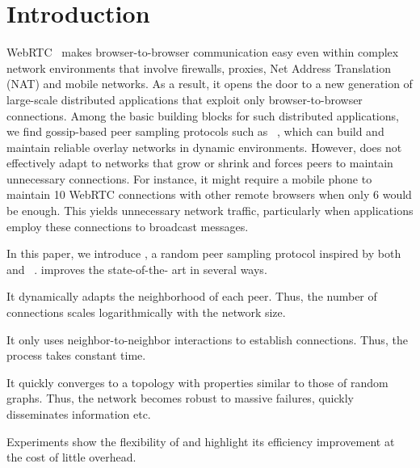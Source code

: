 
\section{Introduction}


WebRTC~\cite{webrtc} makes browser-to-browser communication easy even within
complex network environments that involve firewalls, proxies, Net Address
Translation (NAT) and mobile networks. As a result, it opens the door to a new
generation of large-scale distributed applications that exploit only
browser-to-browser connections. Among the basic building blocks for such
distributed applications, we find gossip-based peer sampling protocols such as
\CYCLON~\cite{voulgaris2005cyclon}, which can build and maintain reliable
overlay networks in dynamic environments.  However, \CYCLON does not effectively
adapt to networks that grow or shrink and forces peers to maintain unnecessary
connections.  For instance, it might require a mobile phone to maintain 10
WebRTC connections with other remote browsers when only 6 would be enough. This
yields unnecessary network traffic, particularly when applications employ these
connections to broadcast messages.

In this paper, we introduce \SPRAY, a random peer sampling protocol
inspired by both \SCAMP~\cite{ganesh2003peer} and
\CYCLON~\cite{voulgaris2005cyclon}. \SPRAY improves the state-of-the-
art in several ways. 
\begin{inparaenum}[(i)]
\item It dynamically adapts the neighborhood of each peer. Thus, the
  number of connections scales logarithmically with the network size.
\item It only uses neighbor-to-neighbor interactions to establish
  connections. Thus, the process takes constant time.
\item It quickly converges to a topology with properties similar to
  those of random graphs. Thus, the network becomes robust to massive
  failures, quickly disseminates information etc.
\item Experiments show the flexibility of \SPRAY and highlight its
  efficiency improvement at the cost of little overhead.
\end{inparaenum}

